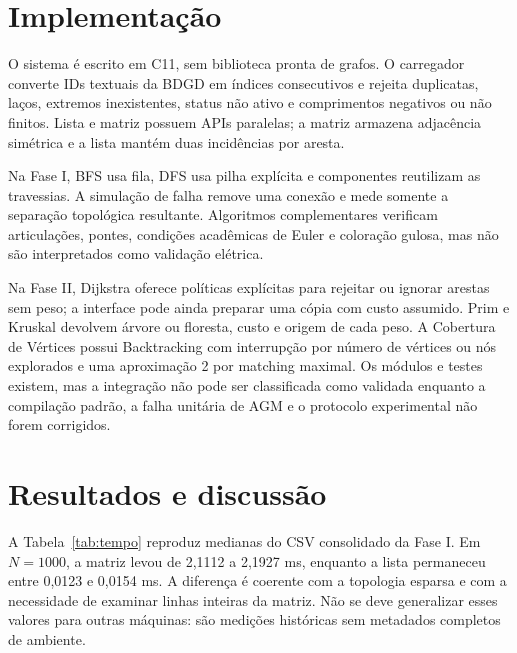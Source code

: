 \documentclass[12pt]{article}
\begin{document}
\section{Implementação}

O sistema é escrito em C11, sem biblioteca pronta de grafos. O carregador converte IDs textuais da BDGD em índices consecutivos e rejeita duplicatas, laços, extremos inexistentes, status não ativo e comprimentos negativos ou não finitos. Lista e matriz possuem APIs paralelas; a matriz armazena adjacência simétrica e a lista mantém duas incidências por aresta.

Na Fase I, BFS usa fila, DFS usa pilha explícita e componentes reutilizam as travessias. A simulação de falha remove uma conexão e mede somente a separação topológica resultante. Algoritmos complementares verificam articulações, pontes, condições acadêmicas de Euler e coloração gulosa, mas não são interpretados como validação elétrica.

Na Fase II, Dijkstra oferece políticas explícitas para rejeitar ou ignorar arestas sem peso; a interface pode ainda preparar uma cópia com custo assumido. Prim e Kruskal devolvem árvore ou floresta, custo e origem de cada peso. A Cobertura de Vértices possui Backtracking com interrupção por número de vértices ou nós explorados e uma aproximação 2 por matching maximal. Os módulos e testes existem, mas a integração não pode ser classificada como validada enquanto a compilação padrão, a falha unitária de AGM e o protocolo experimental não forem corrigidos.

\section{Resultados e discussão}

A Tabela~\ref{tab:tempo} reproduz medianas do CSV consolidado da Fase I. Em $N=1000$, a matriz levou de 2,1112 a 2,1927 ms, enquanto a lista permaneceu entre 0,0123 e 0,0154 ms. A diferença é coerente com a topologia esparsa e com a necessidade de examinar linhas inteiras da matriz. Não se deve generalizar esses valores para outras máquinas: são medições históricas sem metadados completos de ambiente.
\end{document}
